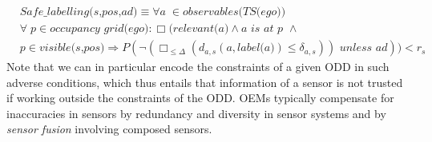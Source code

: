 \begin{align}\label{eq:safelabelling(s,pos,ad)}
&\textit{Safe}\_\textit{labelling(s,pos,ad)} \equiv\forall a\in \textit{observables(TS(ego))}\\  	
&\forall p\in\textit{occupancy grid(ego)}   :\Box(\textit{relevant(a)} \land a\textit{ is at p }\land \nonumber\\
& p\in\textit{visible(s,pos)} \Rightarrow P(\neg(\Box_{\leq\Delta} (d_{a,s}(a, \textit{label(a)})\leq \delta_{a,s}))\textit{ unless } ad)) < r_s\nonumber
\end{align}
Note that we can in particular encode the constraints of a given ODD in such adverse conditions, which thus entails that information of a sensor is not trusted if working outside the constraints of the ODD. OEMs typically compensate for inaccuracies in sensors by redundancy and diversity in sensor systems and by \emph{sensor fusion} involving composed sensors.

